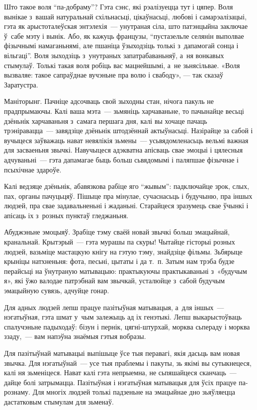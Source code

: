 Што такое воля ``па-добраму''? Гэта сэнс, які рэалізуецца тут і цяпер. Воля вынікае з~вашай натуральнай схільнасьці, цікаўнасьці, любові і самарэалізацыі, гэта як арыстоталеўская энтэлехія~--- унутраная сіла, што патэнцыйна заключае ў~сабе мэту і вынік. Або, як кажуць французы, ``пустазельле селянін выполвае фізычнымі намаганьнямі, але пшаніца ўзыходзіць толькі з~дапамогай сонца і вільгаці''. Воля зыходзіць з~унутраных запатрабаваньняў, а~ня вонкавых стымулаў. Толькі такая воля робіць вас мацнейшымі, а~не зьнясільвае. «Воля вызваляе: такое сапраўднае вучэньне пра волю і свабоду», — так сказаў Заратустра.

Маніторынг. Пачніце адсочваць свой зыходны стан, нічога пакуль не прадпрымаючы. Калі ваша мэта~--- зьмяніць харчаваньне, то пачынайце весьці дзёньнік харчаваньня з~самага першага дня, калі вы хочаце пачаць трэніравацца~--- завядзіце дзёньнік штодзённай актыўнасьці. Назірайце за сабой і вучыцеся заўважаць нават невялікія зьмены~--- усьвядомленасьць вельмі важная для засваеньня звычкі. Навучыцеся адэкватна апісваць свае эмоцыі і цялесныя адчуваньні~--- гэта дапамагае быць больш сьвядомымі і паляпшае фізычнае і псыхічнае здароўе.

Калі ведзяце дзёньнік, абавязкова рабіце яго ``жывым'': падключайце зрок, слых, пах, органы пачуцьцяў. Пішыце пра мінулае, сучаснасьць і будучыню, пра іншых людзей, пра свае задавальненьні і жаданьні. Старайцеся зразумець свае ўчынкі і апісаць іх з~розных пунктаў гледжаньня.

Абуджэньне эмоцыяў. Зрабіце тэму сваёй новай звычкі больш эмацыйнай, кранальнай. Крытэрый~--- гэта мурашы па скуры! Чытайце гісторыі розных людзей, вазьміце мастацкую кнігу на гэтую тэму, знайдзіце фільмы. Зьбярыце крыніцы натхненьня: фота, песьні, цытаты і да т.~п. Затым нам трэба будзе перайсьці на ўнутраную матывацыю: практыкуючы практыкаваньні з~«будучым я», які ўжо валодае патрэбнай вам звычкай, усталюйце з~сабой будучым эмацыйную сувязь, адчуйце гонар.

Для адных людзей лепш працуе пазітыўная матывацыя, а~для іншых~--- нэгатыўная, гэта шмат у~чым залежыць ад іх генэтыкі. Лепш выкарыстоўваць спалучэньне падыходаў: бізун і пернік, цягні-штурхай, морква сьпераду і морква ззаду,~--- вам напэўна знаёмыя гэтыя вобразы.

Для пазітыўнай матывацыі выпішыце ўсе тыя перавагі, якія дасьць вам новая звычка. Для нэгатыўнай~--- усе тыя праблемы і пакуты, зь якімі вы сутыкнецеся, калі ня зьменіцеся. Нават калі гэта непрыемна, не сьпяшайцеся сканчаць~--- дайце болі затрымацца. Пазітыўная і нэгатыўная матывацыя для ўсіх працуе па-рознаму. Для многіх людзей толькі падзеньне на эмацыйнае дно зьяўляецца дастатковым стымулам для зьменаў.

